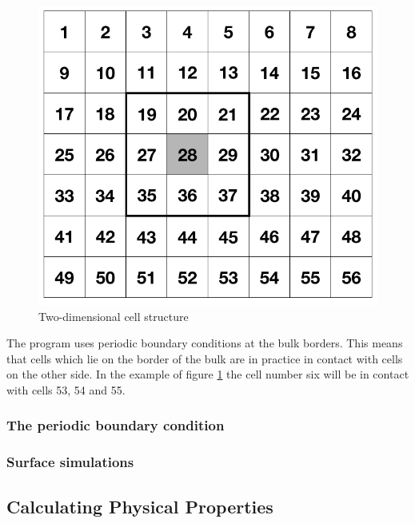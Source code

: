 \documentclass[12pt,a4paper]{article}
\begin{document}
\begin{figure}[h]
\begin{center}
\includegraphics[scale=0.4]{figs/cells.png}
\caption{\small Two-dimensional cell structure
\label{fig:cells}}
\end{center}
\end{figure}

The program uses periodic boundary conditions at the bulk borders. This means that cells which lie on the border of the bulk are in practice in contact with cells on the other side. In the example of figure \ref{fig:cells} the cell number six will be in contact with cells 53, 54 and 55. 


\subsubsection{The periodic boundary condition}
\label{sec:the_periodic_boundary_condition}

\subsubsection{Surface simulations}
\label{sec:surface_simulations}


\subsection{Calculating Physical Properties}
\label{sec:calculating_physical_properties}
\end{document}
